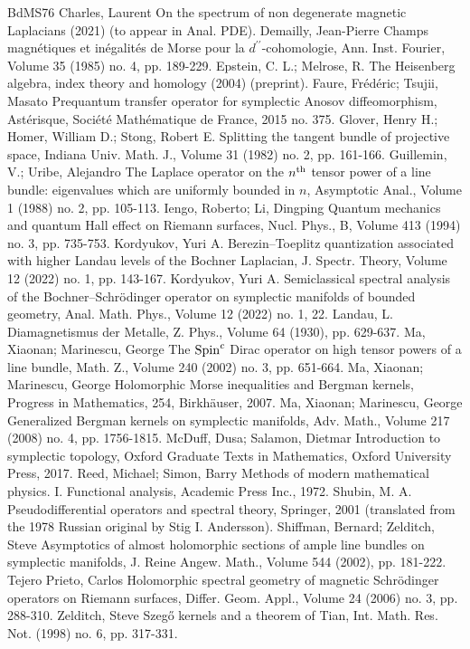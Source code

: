 \documentclass[10pt,a4paper]{article}
\theoremstyle{definition}
\numberwithin{equation}{section}
\begin{document}
\begin{thebibliography}{BdMS76}
 Charles, Laurent On the spectrum of non degenerate magnetic Laplacians (2021) (to appear in Anal. PDE).
 Demailly, Jean-Pierre Champs magnétiques et inégalités de Morse pour la $d^{\prime \prime }$-cohomologie, Ann. Inst. Fourier, Volume 35 (1985) no. 4, pp. 189-229.
 Epstein, C. L.; Melrose, R. The Heisenberg algebra, index theory and homology (2004) (preprint).
 Faure, Frédéric; Tsujii, Masato Prequantum transfer operator for symplectic Anosov diffeomorphism, Astérisque, Société Mathématique de France, 2015 no. 375.
 Glover, Henry H.; Homer, William D.; Stong, Robert E. Splitting the tangent bundle of projective space, Indiana Univ. Math. J., Volume 31 (1982) no. 2, pp. 161-166.
 Guillemin, V.; Uribe, Alejandro The Laplace operator on the $n^{\rm th}$ tensor power of a line bundle: eigenvalues which are uniformly bounded in $n$, Asymptotic Anal., Volume 1 (1988) no. 2, pp. 105-113.
 Iengo, Roberto; Li, Dingping Quantum mechanics and quantum Hall effect on Riemann surfaces, Nucl. Phys., B, Volume 413 (1994) no. 3, pp. 735-753.
 Kordyukov, Yuri A. Berezin–Toeplitz quantization associated with higher Landau levels of the Bochner Laplacian, J. Spectr. Theory, Volume 12 (2022) no. 1, pp. 143-167.
 Kordyukov, Yuri A. Semiclassical spectral analysis of the Bochner–Schrödinger operator on symplectic manifolds of bounded geometry, Anal. Math. Phys., Volume 12 (2022) no. 1, 22.
 Landau, L. Diamagnetismus der Metalle, Z. Phys., Volume 64 (1930), pp. 629-637.
 Ma, Xiaonan; Marinescu, George The ${\rm {Spin}}^c$ Dirac operator on high tensor powers of a line bundle, Math. Z., Volume 240 (2002) no. 3, pp. 651-664.
 Ma, Xiaonan; Marinescu, George Holomorphic Morse inequalities and Bergman kernels, Progress in Mathematics, 254, Birkhäuser, 2007.
 Ma, Xiaonan; Marinescu, George Generalized Bergman kernels on symplectic manifolds, Adv. Math., Volume 217 (2008) no. 4, pp. 1756-1815.
 McDuff, Dusa; Salamon, Dietmar Introduction to symplectic topology, Oxford Graduate Texts in Mathematics, Oxford University Press, 2017.
 Reed, Michael; Simon, Barry Methods of modern mathematical physics. I. Functional analysis, Academic Press Inc., 1972.
 Shubin, M. A. Pseudodifferential operators and spectral theory, Springer, 2001 (translated from the 1978 Russian original by Stig I. Andersson).
 Shiffman, Bernard; Zelditch, Steve Asymptotics of almost holomorphic sections of ample line bundles on symplectic manifolds, J. Reine Angew. Math., Volume 544 (2002), pp. 181-222.
 Tejero Prieto, Carlos Holomorphic spectral geometry of magnetic Schrödinger operators on Riemann surfaces, Differ. Geom. Appl., Volume 24 (2006) no. 3, pp. 288-310.
 Zelditch, Steve Szegő kernels and a theorem of Tian, Int. Math. Res. Not. (1998) no. 6, pp. 317-331.
\end{thebibliography}
\end{document}
